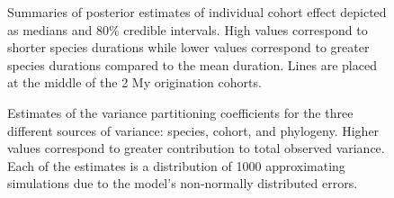 \documentclass[12pt]{article}
\begin{document}
\begin{figure}[ht]
  \caption{Summaries of posterior estimates of individual cohort effect depicted as medians and 80\% credible intervals. High values correspond to shorter species durations while lower values correspond to greater species durations compared to the mean duration. Lines are placed at the middle of the 2 My origination cohorts.}
  \label{fig:eff_cohort}
\end{figure}

\begin{figure}[ht]
  \caption{Estimates of the variance partitioning coefficients for the three different sources of variance: species, cohort, and phylogeny. Higher values correspond to greater contribution to total observed variance. Each of the estimates is a distribution of 1000 approximating simulations due to the model's non-normally distributed errors.}
  \label{fig:vpc}
\end{figure}
\end{document}
